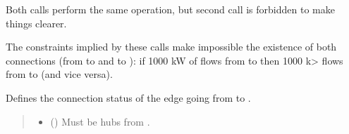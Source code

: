 \documentclass[letterpaper,10pt,english]{sphinxmanual}
\begin{document}
\begin{fulllineitems}
\begin{fulllineitems}
\sphinxAtStartPar
Both calls perform the same operation, but second call is forbidden to make things clearer.

\begin{sphinxVerbatim}[commandchars=\\\{\}]
  
  
\end{sphinxVerbatim}

\sphinxAtStartPar
The constraints implied by these calls make impossible the existence of both connections
(from  to  and  to ): if 1000 kW of  flows from  to 
then \sphinxhyphen{}1000 k\textgreater{} flows from  to  (and vice versa).

\end{fulllineitems}


\begin{fulllineitems}
\label{\detokenize{generated/tamos.network.ThermalNetwork:tamos.network.ThermalNetwork.set_connection_status}}
\pysigstartsignatures
{}
\pysigstopsignatures
\sphinxAtStartPar
Defines the connection status of the edge going from  to .
\begin{quote}\begin{description}
\begin{itemize}
\item {} 
\sphinxAtStartPar
{} ({\hyperref[\detokenize{generated/tamos.Hub:tamos.Hub}]{}}) \textendash{} Must be hubs from .


\end{itemize}
\end{description}
\end{quote}
\end{fulllineitems}
\end{fulllineitems}
\end{document}
